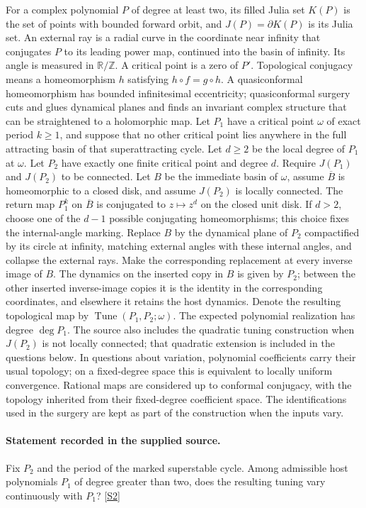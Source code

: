 \documentclass[11pt]{article}
\newcommand{\sref}[2]{\hyperlink{source:#1:#2}{[S#2]}}
\begin{document}
For a complex polynomial $P$ of degree at least two, its filled Julia set $K(P)$ is the set of points with bounded forward orbit, and $J(P)=\partial K(P)$ is its Julia set. An external ray is a radial curve in the coordinate near infinity that conjugates $P$ to its leading power map, continued into the basin of infinity. Its angle is measured in $\mathbb R/\mathbb Z$. A critical point is a zero of $P'$. Topological conjugacy means a homeomorphism $h$ satisfying $h\circ f=g\circ h$. A quasiconformal homeomorphism has bounded infinitesimal eccentricity; quasiconformal surgery cuts and glues dynamical planes and finds an invariant complex structure that can be straightened to a holomorphic map.
Let $P_1$ have a critical point $\omega$ of exact period $k\geq1$, and suppose that no other critical point lies anywhere in the full attracting basin of that superattracting cycle. Let $d\geq2$ be the local degree of $P_1$ at $\omega$. Let $P_2$ have exactly one finite critical point and degree $d$. Require $J(P_1)$ and $J(P_2)$ to be connected. Let $B$ be the immediate basin of $\omega$, assume $\overline B$ is homeomorphic to a closed disk, and assume $J(P_2)$ is locally connected. The return map $P_1^k$ on $\overline B$ is conjugated to $z\mapsto z^d$ on the closed unit disk. If $d>2$, choose one of the $d-1$ possible conjugating homeomorphisms; this choice fixes the internal-angle marking.
Replace $B$ by the dynamical plane of $P_2$ compactified by its circle at infinity, matching external angles with these internal angles, and collapse the external rays. Make the corresponding replacement at every inverse image of $B$. The dynamics on the inserted copy in $B$ is given by $P_2$; between the other inserted inverse-image copies it is the identity in the corresponding coordinates, and elsewhere it retains the host dynamics. Denote the resulting topological map by $\operatorname{Tune}(P_1,P_2;\omega)$. The expected polynomial realization has degree $\deg P_1$. The source also includes the quadratic tuning construction when $J(P_2)$ is not locally connected; that quadratic extension is included in the questions below.
In questions about variation, polynomial coefficients carry their usual topology; on a fixed-degree space this is equivalent to locally uniform convergence. Rational maps are considered up to conformal conjugacy, with the topology inherited from their fixed-degree coefficient space. The identifications used in the surgery are kept as part of the construction when the inputs vary.
\paragraph{Statement recorded in the supplied source.}
Fix $P_2$ and the period of the marked superstable cycle. Among admissible host polynomials $P_1$ of degree greater than two, does the resulting tuning vary continuously with $P_1$? \sref{5300007}{2}
\end{document}
